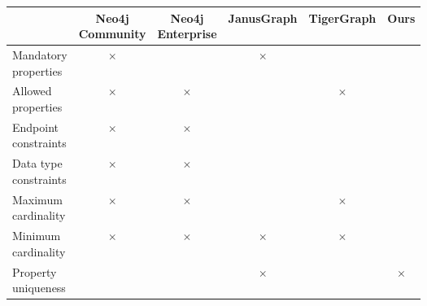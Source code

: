 \documentclass{report}
\theoremstyle{definition}
\newcommand{\yes}{\cellcolor{lightgreen}\color{green}\checkmark}
\newcommand{\no}{\cellcolor{lightred}\color{red}$\times$}
\begin{document}
\begin{table}[t]
  \centering
  \begin{tabular}{lccccc}
    \hline
     & \makecell{\textbf{Neo4j}\\\textbf{Community}}     & \makecell{\textbf{Neo4j}\\\textbf{Enterprise}}      & \textbf{JanusGraph} & \textbf{TigerGraph} & \textbf{Ours} \\
    \hline
    \makecell[l]{Mandatory                                                                                     \\properties}   & \no                & \yes                & \no                 & \yes                & \yes          \\
    \hline
    \makecell[l]{Allowed                                                                                       \\properties}     & \no                & \no                 & \yes                & \no                 & \yes          \\
    \hline
    \makecell[l]{Endpoint                                                                                      \\constraints}    & \no                & \no                 & \yes                & \yes                & \yes          \\
    \hline
    \makecell[l]{Data type                                                                                     \\constraints}   & \no                & \no                 & \yes                & \yes                & \yes          \\
    \hline
    \makecell[l]{Maximum                                                                                       \\cardinality}     & \no                & \no                 & \yes*               & \no                 & \yes          \\
    \hline
    \makecell[l]{Minimum                                                                                       \\cardinality}     & \no                & \no                 & \no                 & \no                 & \yes          \\
    \hline
    \makecell[l]{Property                                                                                      \\uniqueness}    & \yes               & \yes                & \no                 & \yes                & \no           \\

\end{tabular}
\end{table}
\end{document}
